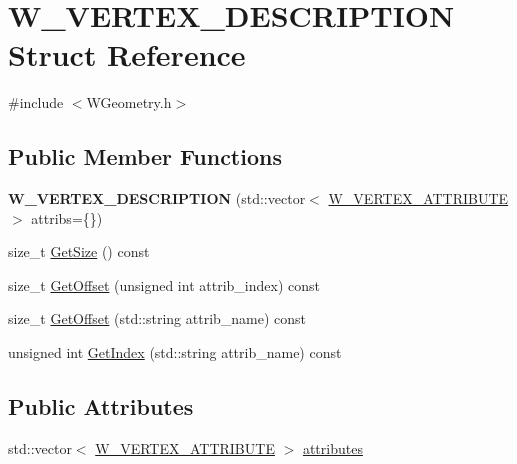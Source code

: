 \hypertarget{struct_w___v_e_r_t_e_x___d_e_s_c_r_i_p_t_i_o_n}{}\section{W\+\_\+\+V\+E\+R\+T\+E\+X\+\_\+\+D\+E\+S\+C\+R\+I\+P\+T\+I\+ON Struct Reference}
\label{struct_w___v_e_r_t_e_x___d_e_s_c_r_i_p_t_i_o_n}


{\ttfamily \#include $<$W\+Geometry.\+h$>$}

\subsection*{Public Member Functions}
\begin{DoxyCompactItemize}
\item 
{\bfseries W\+\_\+\+V\+E\+R\+T\+E\+X\+\_\+\+D\+E\+S\+C\+R\+I\+P\+T\+I\+ON} (std\+::vector$<$ \hyperlink{struct_w___v_e_r_t_e_x___a_t_t_r_i_b_u_t_e}{W\+\_\+\+V\+E\+R\+T\+E\+X\+\_\+\+A\+T\+T\+R\+I\+B\+U\+TE} $>$ attribs=\{\})\hypertarget{struct_w___v_e_r_t_e_x___d_e_s_c_r_i_p_t_i_o_n_a333f0377b3556311a11edda7c4e18a8b}{}\label{struct_w___v_e_r_t_e_x___d_e_s_c_r_i_p_t_i_o_n_a333f0377b3556311a11edda7c4e18a8b}

\item 
size\+\_\+t \hyperlink{struct_w___v_e_r_t_e_x___d_e_s_c_r_i_p_t_i_o_n_a7c06d9c07ee2fdd4d47c06592e79158e}{Get\+Size} () const 
\item 
size\+\_\+t \hyperlink{struct_w___v_e_r_t_e_x___d_e_s_c_r_i_p_t_i_o_n_a06aea062550c1ce607bc3dbffebaa74f}{Get\+Offset} (unsigned int attrib\+\_\+index) const 
\item 
size\+\_\+t \hyperlink{struct_w___v_e_r_t_e_x___d_e_s_c_r_i_p_t_i_o_n_a541b178fbbf15c4166c51d59f377994d}{Get\+Offset} (std\+::string attrib\+\_\+name) const 
\item 
unsigned int \hyperlink{struct_w___v_e_r_t_e_x___d_e_s_c_r_i_p_t_i_o_n_a981ce484b325b9cb8380076d8b21dbd8}{Get\+Index} (std\+::string attrib\+\_\+name) const 
\end{DoxyCompactItemize}
\subsection*{Public Attributes}
\begin{DoxyCompactItemize}
\item 
std\+::vector$<$ \hyperlink{struct_w___v_e_r_t_e_x___a_t_t_r_i_b_u_t_e}{W\+\_\+\+V\+E\+R\+T\+E\+X\+\_\+\+A\+T\+T\+R\+I\+B\+U\+TE} $>$ \hyperlink{struct_w___v_e_r_t_e_x___d_e_s_c_r_i_p_t_i_o_n_a559e7d9127c860535a58ba6217fb7fd5}{attributes}
\end{DoxyCompactItemize}


